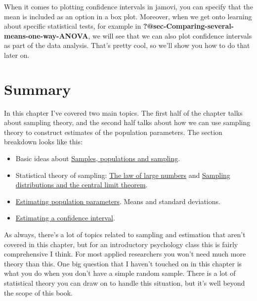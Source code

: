 \documentclass[
  a4paper,
]{book}
\providecommand{\tightlist}{%
  \setlength{\itemsep}{0pt}\setlength{\parskip}{0pt}}\usepackage{longtable,booktabs,array}
\begin{document}
When it comes to plotting confidence intervals in jamovi, you can
specify that the mean is included as an option in a box plot. Moreover,
when we get onto learning about specific statistical tests, for example
in \textbf{?@sec-Comparing-several-means-one-way-ANOVA}, we will see
that we can also plot confidence intervals as part of the data analysis.
That's pretty cool, so we'll show you how to do that later on.

\hypertarget{summary-6}{%
\section{Summary}\label{summary-6}}

In this chapter I've covered two main topics. The first half of the
chapter talks about sampling theory, and the second half talks about how
we can use sampling theory to construct estimates of the population
parameters. The section breakdown looks like this:

\begin{itemize}
\tightlist
\item
  Basic ideas about
  \protect\hyperlink{samples-populations-and-sampling}{Samples,
  populations and sampling}.
\item
  Statistical theory of sampling:
  \protect\hyperlink{the-law-of-large-numbers}{The law of large numbers}
  and
  \protect\hyperlink{sampling-distributions-and-the-central-limit-theorem}{Sampling
  distributions and the central limit theorem}.
\item
  \protect\hyperlink{estimating-population-parameters}{Estimating
  population parameters}. Means and standard deviations.
\item
  \protect\hyperlink{sec-Estimating-a-confidence-interval}{Estimating a
  confidence interval}.
\end{itemize}

As always, there's a lot of topics related to sampling and estimation
that aren't covered in this chapter, but for an introductory psychology
class this is fairly comprehensive I think. For most applied researchers
you won't need much more theory than this. One big question that I
haven't touched on in this chapter is what you do when you don't have a
simple random sample. There is a lot of statistical theory you can draw
on to handle this situation, but it's well beyond the scope of this
book.
\end{document}
